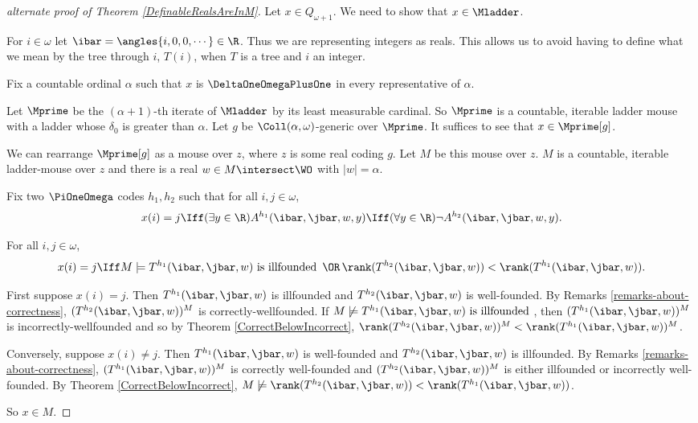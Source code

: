 \documentclass[oneside,12pt]{amsart}
\begin{document}
\begin{proof}[alternate proof of Theorem \ref{DefinableRealsAreInM}]
Let $x\in Q_{\omega+1}$. We need to show that $x\in\Mladder$.

For $i\in\omega$ let $\ibar=\angles{i,0,0,\cdots}\in\R$. Thus we are representing integers as reals.
This allows us to avoid having to define what we mean by the tree through $i$, $T(i)$, when $T$ is a tree and $i$ an integer.


Fix a countable ordinal $\alpha$ such that $x$ is $\DeltaOneOmegaPlusOne$ in every representative
of $\alpha$.

Let $\Mprime$ be the $(\alpha+1)$-th iterate of $\Mladder$ by its least
measurable cardinal. So $\Mprime$ is a countable, iterable ladder mouse with
a ladder whose $\delta_0$ is greater than $\alpha$. Let $g$ be $\Coll(\alpha,\omega)$-generic
over $\Mprime$. It suffices to see that $x\in\Mprime[g]$.

We can rearrange $\Mprime[g]$ as a mouse over $z$, where $z$ is some real coding $g$.
Let $M$ be this mouse over $z$. $M$ is a countable, iterable ladder-mouse over $z$ and there
is a real $w\in M\intersect\WO$ with $|w|=\alpha$.

Fix two $\PiOneOmega$ codes $h_1,h_2$ such that for all $i,j\in\omega$,
$$x(i)=j \Iff (\exists y\in\R)A^{h_1}(\ibar,\jbar,w,y) \Iff (\forall y\in\R)\neg A^{h_2}(\ibar,\jbar,w,y).$$

\begin{claim}
For all $i,j\in\omega$,
$$x(i)=j \Iff  M \models T^{h_1}(\ibar,\jbar,w) \text{ is illfounded } \,\OR\, \rank(T^{h_2}(\ibar,\jbar,w)) < \rank(T^{h_1}(\ibar,\jbar,w)).$$
\end{claim}
\begin{subproof}
First suppose $x(i)=j$. Then $T^{h_1}(\ibar,\jbar,w)$ is illfounded and 
$T^{h_2}(\ibar,\jbar,w)$ is well-founded. By
Remarks \ref{remarks-about-correctness}, $(T^{h_2}(\ibar,\jbar,w))^M$
is correctly-wellfounded. If $M \not\models T^{h_1}(\ibar,\jbar,w) \text{ is illfounded }$, then $(T^{h_1}(\ibar,\jbar,w))^M$ is incorrectly-wellfounded
and so by Theorem 
\ref{CorrectBelowIncorrect}, 
$\rank(T^{h_2}(\ibar,\jbar,w))^M < \rank(T^{h_1}(\ibar,\jbar,w))^M$.

Conversely, suppose $x(i)\not=j$. Then $T^{h_1}(\ibar,\jbar,w)$ is well-founded and 
$T^{h_2}(\ibar,\jbar,w)$ is illfounded. By Remarks \ref{remarks-about-correctness},
$(T^{h_1}(\ibar,\jbar,w))^M$ is correctly well-founded and 
$(T^{h_2}(\ibar,\jbar,w))^M$ is either illfounded or incorrectly well-founded.
By Theorem \ref{CorrectBelowIncorrect}, 
$M\not\models \rank(T^{h_2}(\ibar,\jbar,w)) < \rank(T^{h_1}(\ibar,\jbar,w))$.
\end{subproof}

So $x\in M$.

\end{proof}
\end{document}
